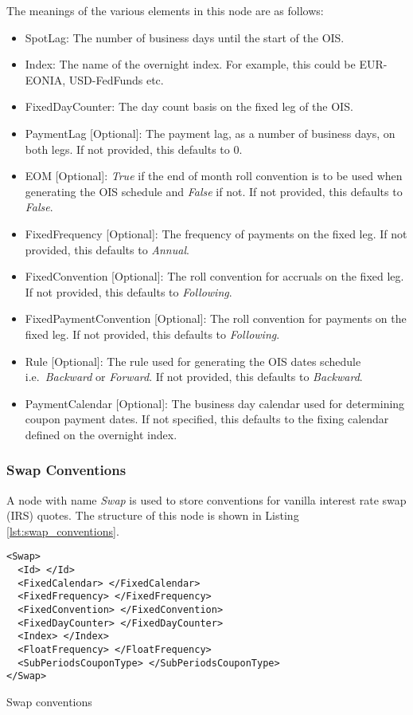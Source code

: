 The meanings of the various elements in this node are as follows:
\begin{itemize}
\item SpotLag: The number of business days until the start of the OIS.
\item Index: The name of the overnight index. For example, this could be EUR-EONIA, USD-FedFunds etc.
\item FixedDayCounter: The day count basis on the fixed leg of the OIS.
\item PaymentLag [Optional]: The payment lag, as a number of business days, on both legs. If not provided, this defaults
to 0.
\item EOM [Optional]: \emph{True} if the end of month roll convention is to be used when generating the OIS schedule and
\emph{False} if not. If not provided, this defaults to \emph{False}.
\item FixedFrequency [Optional]: The frequency of payments on the fixed leg. If not provided, this defaults to
\emph{Annual}.
\item FixedConvention [Optional]: The roll convention for accruals on the fixed leg. If not provided, this defaults to
\emph{Following}.
\item FixedPaymentConvention [Optional]: The roll convention for payments on the fixed leg. If not provided, this
defaults to \emph{Following}.
\item Rule [Optional]: The rule used for generating the OIS dates schedule i.e.\ \emph{Backward} or \emph{Forward}. If
not provided, this defaults to \emph{Backward}.
\item PaymentCalendar [Optional]: The business day calendar used for determining coupon payment dates.
If not specified, this defaults to the fixing calendar defined on the overnight index.
\end{itemize}

\subsubsection{Swap Conventions}
A node with name \emph{Swap} is used to store conventions for vanilla interest rate swap (IRS) quotes. The structure of
this node is shown in Listing \ref{lst:swap_conventions}.

\begin{listing}[H]
\begin{verbatim}
<Swap>
  <Id> </Id>
  <FixedCalendar> </FixedCalendar>
  <FixedFrequency> </FixedFrequency>
  <FixedConvention> </FixedConvention>
  <FixedDayCounter> </FixedDayCounter>
  <Index> </Index>
  <FloatFrequency> </FloatFrequency>
  <SubPeriodsCouponType> </SubPeriodsCouponType>
</Swap>
\end{verbatim}
\caption{Swap conventions}
\label{lst:swap_conventions}
\end{listing}

